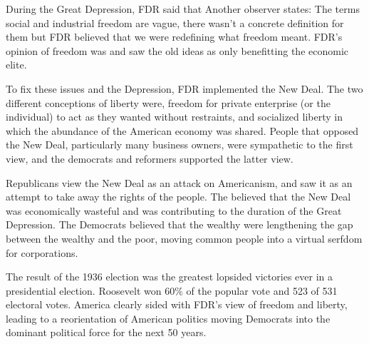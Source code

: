 During the Great Depression, FDR said that 
Another observer states: 
The terms social and industrial freedom are vague, there wasn't a concrete definition for them but FDR believed that we were redefining what freedom meant.
FDR's opinion of freedom was  and saw the old ideas as only benefitting the economic elite.

To fix these issues and the Depression, FDR implemented the New Deal.
The two different conceptions of liberty were, freedom for private enterprise (or the individual) to act as they wanted without restraints, and socialized liberty in which the abundance of the American economy was shared.
People that opposed the New Deal, particularly many business owners, were sympathetic to the first view, and the democrats and reformers supported the latter view.

Republicans view the New Deal as an attack on Americanism, and saw it as an attempt to take away the rights of the people.
The believed that the New Deal was economically wasteful and was contributing to the duration of the Great Depression.
The Democrats believed that the wealthy were lengthening the gap between the wealthy and the poor, moving common people into a virtual serfdom for corporations.

The result of the 1936 election was the greatest lopsided victories ever in a presidential election. 
Roosevelt won 60\% of the popular vote and 523 of 531 electoral votes.
America clearly sided with FDR's view of freedom and liberty, leading to a reorientation of American politics moving Democrats into the dominant political force for the next 50 years.